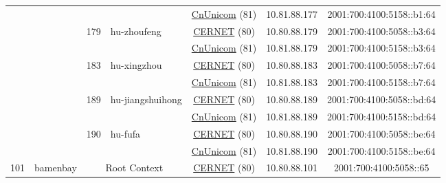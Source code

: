 \begin{small}
\begin{center}
\begin{longtable}{|c|c|c|c|c|c|c|c|}
  &  &  &  & \multicolumn{2}{|c|}{\tiny{\href{http://www.chinaunicom.com}{CnUnicom} (81)}} & \tiny{10.81.88.177} & \tiny{2001:700:4100:5158::b1:64} \\* \cline{3-3}\cline{4-4}\cline{5-5}\cline{6-6}\cline{7-7}\cline{8-8}
  &  & \multirow{2}{*}{\tiny{179}} & \multicolumn{1}{|l|}{\multirow{2}{*}{\tiny{hu-zhoufeng}}} & \multicolumn{2}{|c|}{\tiny{\href{http://www.cernet.edu.cn}{CERNET} (80)}} & \tiny{10.80.88.179} & \tiny{2001:700:4100:5058::b3:64} \\* \cline{5-5}\cline{6-6}\cline{7-7}\cline{8-8}
  &  &  &  & \multicolumn{2}{|c|}{\tiny{\href{http://www.chinaunicom.com}{CnUnicom} (81)}} & \tiny{10.81.88.179} & \tiny{2001:700:4100:5158::b3:64} \\* \cline{3-3}\cline{4-4}\cline{5-5}\cline{6-6}\cline{7-7}\cline{8-8}
  &  & \multirow{2}{*}{\tiny{183}} & \multicolumn{1}{|l|}{\multirow{2}{*}{\tiny{hu-xingzhou}}} & \multicolumn{2}{|c|}{\tiny{\href{http://www.cernet.edu.cn}{CERNET} (80)}} & \tiny{10.80.88.183} & \tiny{2001:700:4100:5058::b7:64} \\* \cline{5-5}\cline{6-6}\cline{7-7}\cline{8-8}
  &  &  &  & \multicolumn{2}{|c|}{\tiny{\href{http://www.chinaunicom.com}{CnUnicom} (81)}} & \tiny{10.81.88.183} & \tiny{2001:700:4100:5158::b7:64} \\* \cline{3-3}\cline{4-4}\cline{5-5}\cline{6-6}\cline{7-7}\cline{8-8}
  &  & \multirow{2}{*}{\tiny{189}} & \multicolumn{1}{|l|}{\multirow{2}{*}{\tiny{hu-jiangshuihong}}} & \multicolumn{2}{|c|}{\tiny{\href{http://www.cernet.edu.cn}{CERNET} (80)}} & \tiny{10.80.88.189} & \tiny{2001:700:4100:5058::bd:64} \\* \cline{5-5}\cline{6-6}\cline{7-7}\cline{8-8}
  &  &  &  & \multicolumn{2}{|c|}{\tiny{\href{http://www.chinaunicom.com}{CnUnicom} (81)}} & \tiny{10.81.88.189} & \tiny{2001:700:4100:5158::bd:64} \\* \cline{3-3}\cline{4-4}\cline{5-5}\cline{6-6}\cline{7-7}\cline{8-8}
  &  & \multirow{2}{*}{\tiny{190}} & \multicolumn{1}{|l|}{\multirow{2}{*}{\tiny{hu-fufa}}} & \multicolumn{2}{|c|}{\tiny{\href{http://www.cernet.edu.cn}{CERNET} (80)}} & \tiny{10.80.88.190} & \tiny{2001:700:4100:5058::be:64} \\* \cline{5-5}\cline{6-6}\cline{7-7}\cline{8-8}
  &  &  &  & \multicolumn{2}{|c|}{\tiny{\href{http://www.chinaunicom.com}{CnUnicom} (81)}} & \tiny{10.81.88.190} & \tiny{2001:700:4100:5158::be:64} \\ \hline
 \multirow{24}{*}{\tiny{101}} & \multicolumn{1}{|l|}{\multirow{24}{*}{\tiny{bamenbay}}} & \multicolumn{2}{|c|}{\multirow{2}{*}{\tiny{Root Context}}} & \multicolumn{2}{|c|}{\tiny{\href{http://www.cernet.edu.cn}{CERNET} (80)}} & \tiny{10.80.88.101} & \tiny{2001:700:4100:5058::65} \\* \cline{5-5}\cline{6-6}\cline{7-7}\cline{8-8}

\end{longtable}
\end{center}
\end{small}

